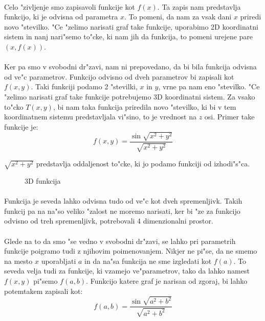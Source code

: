 \paragraph{}
Celo "zivljenje smo zapisavoli funkcije kot $f(x)$. Ta zapis nam predstavlja funkcijo, ki je odvisna od parametra $x$. To pomeni, da nam za vsak dani $x$ priredi novo "stevilko. "Ce "zelimo narisati graf take funkcije, uporabimo 2D koordinatni sistem in nanj nari"semo to"cke, ki nam jih da funkcija, to pomeni urejene pare $(x, f(x))$.

\paragraph{}
Ker pa smo v svobodni dr"zavi, nam ni prepovedano, da bi bila funkcija odvisna od ve"c parametrov. Funkcijo odvisno od dveh parametrov bi zapisali kot $f(x,y)$. Taki funkciji podamo 2 "stevilki, $x$ in $y$, vrne pa nam eno "stevilko. "Ce "zelimo narisati graf take funkcije potrebujemo 3D koordinatni sistem. Za vsako to"cko $T(x,y)$, bi nam taka funkcija priredila novo "stevilko, ki bi v tem koordinatnem sistemu predstavljala vi"sino, to je vrednost na $z$ osi. Primer take funkcije je:
\[f(x,y) = \frac{\sin \sqrt{x^2 + y^2}}{\sqrt{x^2 + y^2}} \]

$\sqrt{x^2 + y^2}$ predstavlja oddaljenost to"cke, ki jo podamo funkciji od izhodi"s"ca.

\begin{figure}[h!]
	\centering
	\caption{3D funkcija}
\end{figure}

\paragraph{}
Funkcija je seveda lahko odvisna tudo od ve"c kot dveh spremenljivk. Takih funkcij pa na na"so veliko "zalost ne moremo narisati, ker bi "ze za funkcijo odvisno od treh spremenljivk, potrebovali 4 dimenzionalni prostor.

\paragraph{}
Glede na to da smo "se vedno v svobodni dr"zavi, se lahko pri parametrih funkcije poigramo tudi z njihovim poimenovanjem. Nikjer ne pi"se, da ne smemo na mesto $x$ uporabljati $a$ in da na"sa funkcija ne sme izgledati kot $f(a)$. To seveda velja tudi za funkcije, ki vzamejo ve"parametrov, tako da lahko namest $f(x,y)$ pi"semo $f(a,b)$. Funkcijo katere graf je narisan od zgoraj, bi lahko potemtakem zapisali kot:
\[f(a,b) = \frac{\sin \sqrt{a^2 + b^2}}{\sqrt{a^2 + b^2}} \]

